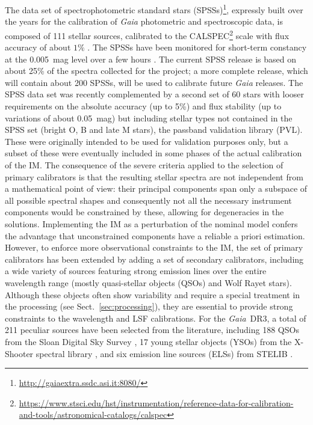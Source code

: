 \documentclass{aa}
\newcommand{\gdr}[1]{\gaia~DR#1\xspace}
\newcommand{\gaia}{\textit{Gaia}\xspace}
\newcommand{\secname}{Sect.}
\newcommand{\secref}[1]{\secname~\ref{sec:#1}}
\begin{document}
The data set of spectrophotometric standard stars (SPSSs)\footnote{\url{http://gaiaextra.ssdc.asi.it:8080/}}, expressly built over the years for the calibration of \gaia photometric and spectroscopic data, is composed of 111 stellar sources, calibrated to the CALSPEC\footnote{\url{https://www.stsci.edu/hst/instrumentation/reference-data-for-calibration-and-tools/astronomical-catalogs/calspec}} scale \citep{bohlin14,bohlin20} with flux accuracy of about $1\%$ \citep{Pancino2012,Altavilla2015,Pancino2021,Altavilla2021}. The SPSSs have been monitored for short-term constancy at the 0.005~mag level over a few hours \citep{Marinoni2016}. The current SPSS release is based on about 25\% of the spectra collected for the project; a more complete release, which will contain about 200 SPSSs, will be used to calibrate future {\em Gaia} releases. The SPSS data set was recently complemented \citep{Pancino2021} by a second set of 60 stars with looser requirements on the absolute accuracy (up to 5\%) and flux stability (up to variations of about 0.05~mag) but 
including stellar types not contained in the SPSS set (bright O, B and late M stars), the passband validation library (PVL). These were originally intended to be used for validation purposes only, but a subset of these were eventually included in some phases of the actual calibration of the IM. 
The consequence of the severe criteria applied to the selection of primary calibrators
is that the resulting stellar spectra are not independent from a mathematical point of view: their principal components span only a subspace of all possible spectral shapes and consequently not all the necessary instrument components would be constrained by these, allowing for degeneracies in the solutions. 
Implementing the IM as a perturbation of the nominal model confers the advantage that unconstrained components have a reliable a priori estimation.
However, to enforce more observational constraints to the IM, 
the set of primary calibrators has been extended by adding a set of secondary calibrators, including a wide variety of sources featuring strong emission lines over the entire wavelength range (mostly 
quasi-stellar objects (QSOs) and Wolf Rayet stars). Although these objects often show variability and require a special treatment in the processing (see \secref{processing}), they are essential to provide strong constraints to the wavelength and LSF calibrations.
For the  \gdr{3,} a total of 211 peculiar sources have been selected from the literature, including 188 QSOs from the Sloan Digital Sky Survey \citep[SDSS; see][and references therein]{Lyke2020}, 17 young stellar objects (YSOs) from the X-Shooter spectral library \citep[][]{Verro2021}, and six emission line sources (ELSs) from STELIB  \citep{LeBorgne2003}. 
\end{document}
